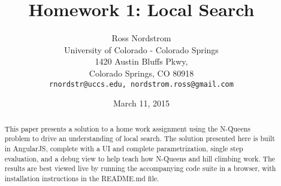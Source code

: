 \documentclass{sig-alternate}
\begin{document}
\title{Homework 1: Local Search}
\author{Ross Nordstrom\\
        University of Colorado - Colorado Springs\\
        1420 Austin Bluffs Pkwy,\\
        Colorado Springs, CO 80918\\
        \texttt{rnordstr@uccs.edu, nordstrom.ross@gmail.com}
       }
\date{March 11, 2015}

\maketitle

\begin{abstract}
   This paper presents a solution to a home work assignment using the N-Queens problem to drive
   an understanding of local search. The solution presented here is built in AngularJS, complete
   with a UI and complete parametrization, single step evaluation, and a debug view to help
   teach how N-Queens and hill climbing work. The results are best viewed live by running
   the accompanying code suite in a browser, with installation instructions in the README.md file.
\end{abstract}






{}

\end{document}
